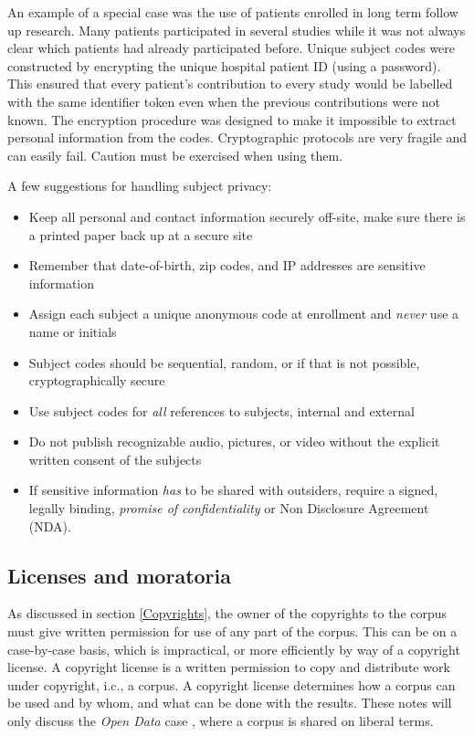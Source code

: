 \documentclass[10pt, a4paper]{article}
\begin{document}
An example of a special case was the use of patients enrolled in long term follow up research. Many patients participated in several studies while it was not always clear which patients had already participated before. Unique subject codes were constructed by encrypting the unique hospital patient ID (using a password). This ensured that every patient's contribution to every study would be labelled with the same identifier token even when the previous contributions were not known. The encryption procedure was designed to make it impossible to extract personal information from the codes. Cryptographic protocols are very fragile and can easily fail. Caution must be exercised when using them.

\noindent A few suggestions for handling subject privacy:
\begin{itemize}
\item Keep all personal and contact information securely off-site, make sure there is a printed paper back up at a secure site
\item Remember that date-of-birth, zip codes, and IP addresses are sensitive information
\item Assign each subject a unique anonymous code at enrollment and \emph{never} use a name or initials
\item Subject codes should be sequential, random, or if that is not possible, cryptographically secure
\item Use subject codes for \emph{all} references to subjects, internal and external
\item Do not publish recognizable audio, pictures, or video without the explicit written consent of the subjects
\item If sensitive information \emph{has} to be shared with outsiders, require a signed, legally binding, \emph{promise of confidentiality} \cite{FQS1024} or Non Disclosure Agreement (NDA).
\end{itemize}

\subsection{Licenses and moratoria}

As discussed in section \ref{Copyrights}, the owner of the copyrights to the corpus must give written permission for use of any part of the corpus. This can be on a case-by-case basis, which is impractical, or more efficiently by way of a copyright license. A copyright license is a written permission to copy and distribute work under copyright, i.c., a corpus. A copyright license determines how a corpus can be used and by whom, and what can be done with the results. These notes will only discuss the \emph{Open Data} case \cite{OpenScienceData}, where a corpus is shared on liberal terms. 
\end{document}
